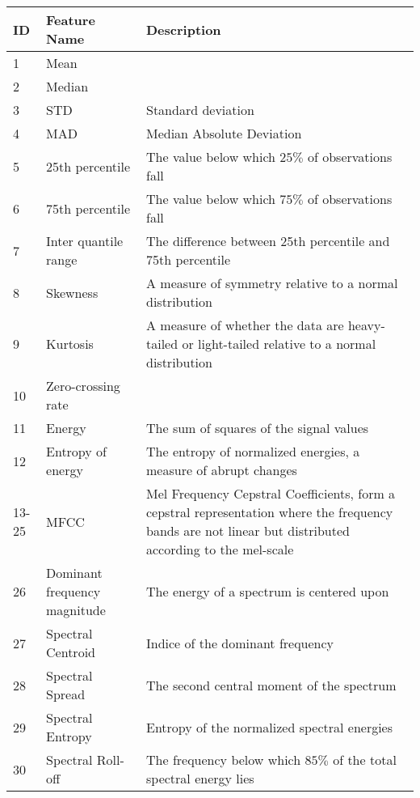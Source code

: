 {
  \scriptsize
  \begin{center}
    \label{tab:table1}
    \begin{tabular}{|l|p{35mm}|p{110mm}|} 
      \hline
      \textbf{ID} & \textbf{Feature Name} & \textbf{Description}\\
      \hline
      \hline
      1 & Mean & \\
      \hline
      2 & Median & \\
      \hline
      3 & STD & Standard deviation\\
      \hline
      4 & MAD & Median Absolute Deviation \\
      \hline
      5 & 25th percentile &  The value below which $25\%$ of observations fall \\
      \hline
      6 & 75th percentile &  The value below which $75\%$ of observations fall \\
      \hline
      7 & Inter quantile range & The difference between 25th percentile and 75th percentile \\
      \hline
      8 & Skewness &  A measure of symmetry relative to a normal distribution \\
      \hline
      9 & Kurtosis &  A measure of whether the data are heavy-tailed or light-tailed relative to a normal distribution \\
      \hline
      10 & Zero-crossing rate & \\
      \hline
      11 & Energy & The sum of squares of the signal values \\
      \hline
 	  12 & Entropy of energy & The entropy of normalized energies, a measure of abrupt changes \\ 
 	  \hline
      13-25 & MFCC & Mel Frequency Cepstral Coefficients, form a cepstral representation where the frequency bands are not linear but distributed according to the mel-scale \\
      \hline
      26 & Dominant frequency magnitude & The energy of a spectrum is centered upon\\
      \hline
      27 & Spectral Centroid & Indice of the dominant frequency \\
      \hline
      28 & Spectral Spread & The second central moment of the spectrum \\
      \hline
      29 & Spectral Entropy & Entropy of the normalized spectral energies \\
      \hline
      30 & Spectral Roll-off & The frequency below which $85\%$ of the total spectral energy lies \\    

\end{tabular}
\end{center}}
